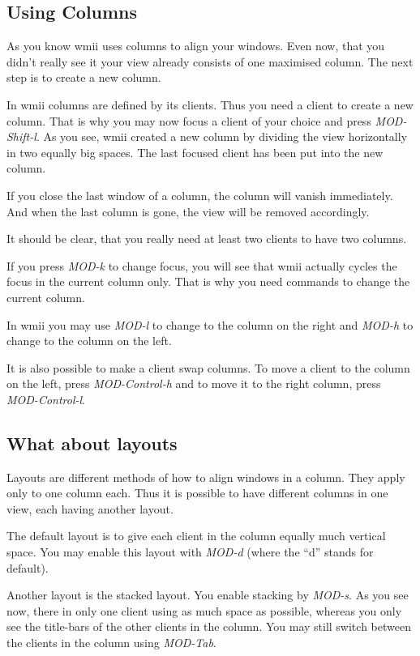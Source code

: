 \documentclass[12pt,a4paper]{article} %
\begin{document}
  \subsection{Using Columns}

    As you know wmii uses columns to align your windows. Even now,
    that you didn't really see it your view already consists of one
    maximised column. The next step is to create a new column.

    In wmii columns are defined by its clients. Thus you need a client
    to create a new column. That is why you may now focus a client of
    your choice and press \emph{MOD-Shift-l}. As you see, wmii created
    a new column by dividing the view horizontally in two equally big
    spaces. The last focused client has been put into the new column.

    If you close the last window of a column, the column will vanish
    immediately. And when the last column is gone, the view will be
    removed accordingly.

    It should be clear, that you really need at least two clients to
    have two columns.

    If you press \emph{MOD-k} to change focus, you will see that wmii
    actually cycles the focus in the current column only. That is why
    you need commands to change the current column.

    In wmii you may use \emph{MOD-l} to change to the column on the
    right and \emph{MOD-h} to change to the column on the left.

    It is also possible to make a client swap columns. To move a
    client to the column on the left, press \emph{MOD-Control-h} and
    to move it to the right column, press \emph{MOD-Control-l}.

  \subsection{What about layouts}

    Layouts are different methods of how to align windows in a
    column. They apply only to one column each. Thus it is possible to
    have different columns in one view, each having another layout.

    The default layout is to give each client in the column equally
    much vertical space. You may enable this layout with \emph{MOD-d}
    (where the ``d'' stands for default).

    Another layout is the stacked layout. You enable stacking by
    \emph{MOD-s}. As you see now, there in only one client using as
    much space as possible, whereas you only see the title-bars of the
    other clients in the column. You may still switch between the
    clients in the column using \emph{MOD-Tab}.
\end{document}
